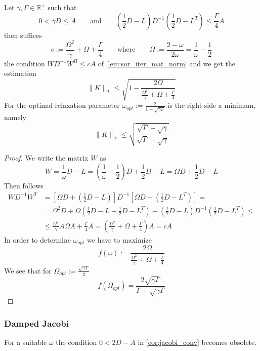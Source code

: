 \begin{theorem}
   Let \(\gamma, \Gamma \in \mathbb{R}^+\) such that
   \[0 < \gamma D \leq A \qquad\text{and}\qquad \left(\frac{1}{2}D - L\right)D^{-1}\left(\frac{1}{2}D - L^T\right) \leq \frac{\Gamma}{4}A\]
   then suffices
   \[c := \frac{\Omega^2}{\gamma} + \Omega + \frac{\Gamma}{4} \qquad\text{where}\qquad \Omega := \frac{2 - \omega}{2\omega} = \frac{1}{\omega} - \frac{1}{2}\]
   the condition \(WD^{-1}W^H \leq cA\) of \cref{lem:sor_iter_mat_norm} and we get the estimation
   \[\|K\|_A \leq \sqrt{1 - \frac{2\Omega}{\frac{\Omega^2}{\gamma} + \Omega + \frac{\Gamma}{4}}}\]
   For the optimal relaxation parameter \(\omega_{opt} := \frac{2}{1 + \sqrt{\gamma\Gamma}}\) is the right side a minimum, namely
   \[\|K\|_A \leq \sqrt{\frac{\sqrt{\Gamma} - \sqrt{\gamma}}{\sqrt{\Gamma} + \sqrt{\gamma}}}\]
\end{theorem}
\begin{proof}
   We write the matrix \(W\) as
   \[W = \frac{1}{\omega}D - L = \left(\frac{1}{\omega} - \frac{1}{2}\right)D + \frac{1}{2}D- L = \Omega D + \frac{1}{2}D - L\]
   Then follows
   \begin{equation*}
      \begin{split}
         WD^{-1}W^T & = \left[\Omega D + \left(\frac{1}{2}D - L\right)\right]D^{-1} \left[\Omega D + \left(\frac{1}{2}D - L^T\right)\right] = \\
                    & = \Omega^2 D + \Omega\left(\frac{1}{2}D - L + \frac{1}{2}D - L^T\right) + \left(\frac{1}{2}D - L\right)D^{-1} \left(\frac{1}{2}D - L^T\right) \leq\\
                    & \leq \frac{\Omega^2}{\gamma} A \Omega A + \frac{\Gamma}{4}A = \left(\frac{\Omega^2}{\gamma} + \Omega + \frac{\Gamma}{4}\right)A = cA
      \end{split}
   \end{equation*}
   In order to determine \(\omega_{opt}\) we have to maximize
   \[f(\omega) := \frac{2 \Omega}{\frac{\Omega^2}{\gamma} + \Omega + \frac{\Gamma}{4}}\]
   We see that for \(\Omega_{opt} := \frac{\sqrt{\gamma\Gamma}}{2}\)
   \[f(\Omega_{opt}) = \frac{2 \sqrt{\gamma\Gamma}}{\Gamma + \sqrt{\gamma\Gamma}}\]
\end{proof}

\subsubsection{Damped Jacobi}
For a suitable \(\omega\) the condition \(0 < 2D - A\) in \cref{cor:jacobi_conv} becomes obsolete.

